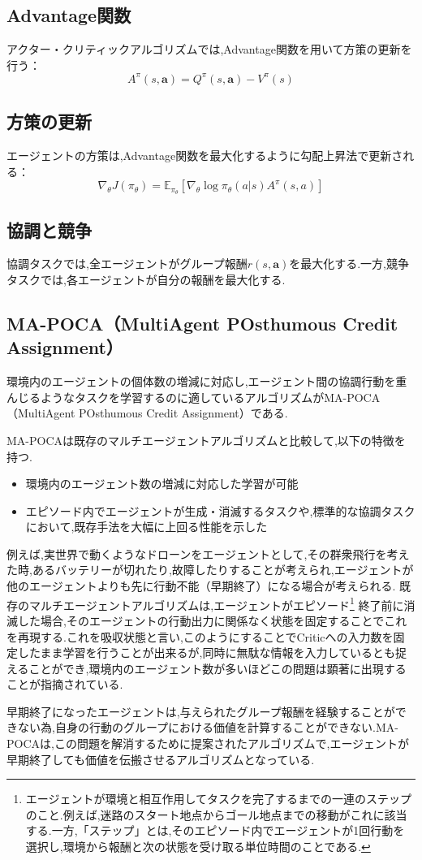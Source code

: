 \subsection*{Advantage関数}
アクター・クリティックアルゴリズムでは,Advantage関数を用いて方策の更新を行う：
\[
A^\pi(s, \boldsymbol{a}) = Q^\pi(s, \boldsymbol{a}) - V^\pi(s)
\]

\subsection*{方策の更新}
エージェントの方策は,Advantage関数を最大化するように勾配上昇法で更新される：
\[
\nabla_\theta J(\pi_\theta) = \mathbb{E}_{\pi_\theta} \left[ \nabla_\theta \log \pi_\theta(a | s) A^\pi(s, a) \right]
\]

\subsection*{協調と競争}
協調タスクでは,全エージェントがグループ報酬$r(s, \boldsymbol{a})$を最大化する.一方,競争タスクでは,各エージェントが自分の報酬を最大化する.

\subsection{MA-POCA（MultiAgent POsthumous Credit Assignment）}
  環境内のエージェントの個体数の増減に対応し,エージェント間の協調行動を重んじるようなタスクを学習するのに適しているアルゴリズムがMA-POCA（MultiAgent POsthumous Credit Assignment）\cite{mapoca}である.\par 
  MA-POCAは既存のマルチエージェントアルゴリズムと比較して,以下の特徴を持つ.
  \begin{itemize}
    \item 環境内のエージェント数の増減に対応した学習が可能
    \item エピソード内でエージェントが生成・消滅するタスクや,標準的な協調タスクにおいて,既存手法を大幅に上回る性能を示した
  \end{itemize}
  例えば,実世界で動くようなドローンをエージェントとして,その群衆飛行を考えた時,あるバッテリーが切れたり,故障したりすることが考えられ,エージェントが他のエージェントよりも先に行動不能（早期終了）になる場合が考えられる.
  既存のマルチエージェントアルゴリズムは,エージェントがエピソード\footnote{エージェントが環境と相互作用してタスクを完了するまでの一連のステップのこと.例えば,迷路のスタート地点からゴール地点までの移動がこれに該当する.一方,「ステップ」とは,そのエピソード内でエージェントが1回行動を選択し,環境から報酬と次の状態を受け取る単位時間のことである.}
  終了前に消滅した場合,そのエージェントの行動出力に関係なく状態を固定することでこれを再現する.これを吸収状態と言い,このようにすることでCriticへの入力数を固定したまま学習を行うことが出来るが,同時に無駄な情報を入力しているとも捉えることができ,環境内のエージェント数が多いほどこの問題は顕著に出現することが指摘されている.\par
  早期終了になったエージェントは,与えられたグループ報酬を経験することができない為,自身の行動のグループにおける価値を計算することができない.MA-POCAは,この問題を解消するために提案されたアルゴリズムで,エージェントが早期終了しても価値を伝搬させるアルゴリズムとなっている.\par
